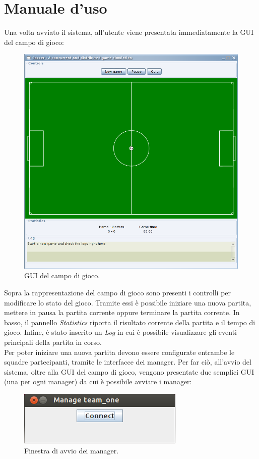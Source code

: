 \appendix
\section{Manuale d'uso}
Una volta avviato il sistema, all'utente viene presentata immediatamente la GUI del campo di gioco:
\begin{figure}[h]
	\centering
	\includegraphics[scale=.5,width=\textwidth]{images/field_start}
	\caption{GUI del campo di gioco.}
\end{figure}

Sopra la rappresentazione del campo di gioco sono presenti i controlli per modificare lo stato del gioco. Tramite essi è possibile iniziare una nuova partita, mettere in pausa la partita corrente oppure terminare la partita corrente. In basso, il pannello \emph{Statistics} riporta il risultato corrente della partita e il tempo di gioco. Infine, è stato inserito un \emph{Log} in cui è possibile visualizzare gli eventi principali della partita in corso.\\

Per poter iniziare una nuova partita devono essere configurate entrambe le squadre partecipanti, tramite le interfacce dei manager. Per far ciò, all'avvio del sistema, oltre alla GUI del campo di gioco, vengono presentate due semplici GUI (una per ogni manager) da cui è possibile avviare i manager:
\begin{figure}[h]
	\centering
	\includegraphics[scale=.5]{images/manager_connect}
	\caption{Finestra di avvio dei manager.}
\end{figure}

